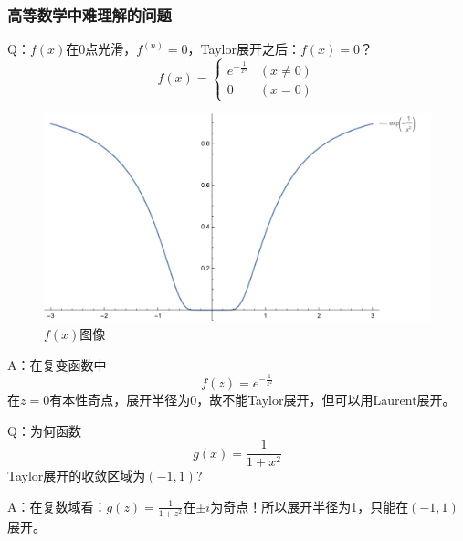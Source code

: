 \subsubsection{高等数学中难理解的问题}
Q：$f(x)$在0点光滑，$f^{(n)} = 0$，Taylor展开之后：$f(x) = 0$？
\[
f(x) = \left\{
\begin{array}{lc}
e^{-\frac{1}{x^2}} & (x \neq 0)\\
0                  & (x = 0)     
\end{array}
\right.
\]

\begin{figure}
	\centering
	\includegraphics[width=14cm]{Figures/Exp[-x^-2].pdf}
	\caption{\(f(x)\)图像}
\end{figure}

A：在复变函数中
\[f(z)=e^{-\frac{1}{z^2}}\]
在$z = 0$有本性奇点，展开半径为0，故不能Taylor展开，但可以用Laurent展开。

Q：为何函数
\[g(x)=\frac{1}{1+x^2}\]
Taylor展开的收敛区域为$(-1,1)$?

A：在复数域看：$g(z)=\frac{1}{1+z^2}$在$\pm i$为奇点！所以展开半径为1，只能在$(-1,1)$展开。




